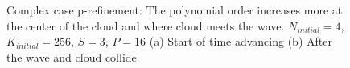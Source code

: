 \begin{figure}[H]
    \centering
    \hfill
    \caption{Complex case p-refinement: The polynomial order increases more at the center of the
        cloud and where cloud meets the wave. \(N_{initial} = 4\), \(K_{initial} = 256\), \(S = 3\), 
        \(P = 16\) (a) Start of time advancing (b) After the wave and cloud 
        collide}\label{fig:cloud_N}
\end{figure}

